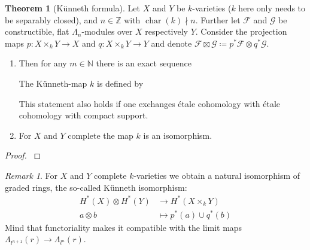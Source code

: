 \documentclass[english,headsepline=0.25pt]{scrartcl}
\theoremstyle{definition}
\newtheorem{Thm}[Def]{Theorem}
\theoremstyle{remark}
\newtheorem{Rem}[Def]{Remark}
\newcommand*{\N}{\mathds{N}}
\newcommand*{\Z}{\mathds{Z}}
\newcommand*{\Zmod}[1]{\Z/#1} %
\newcommand*{\F}{\mathcal{F}} %
\newcommand*{\G}{\mathcal{G}} %
\DeclareMathOperator{\Char}{char} %
\DeclareMathOperator{\Tor}{Tor} %
\begin{document}
\begin{Thm}[Künneth formula]\label{kuennethiso}
  Let $X$ and $Y$ be $k$-varieties
  ($k$ here only needs to be separably closed), and
  $n\in\Z$ with $\Char(k)\nmid n$.
  Further let $\F$ and $\G$ be constructible, flat $\Lambda_n$-modules
  over $X$ respectively $Y$.
  Consider the projection maps
  $p\colon X\times_k Y\to X$ and
  $q\colon X\times_k Y\to Y$ and denote
  $\F\boxtimes\G\coloneqq p^*\F\otimes q^*\G$. 
  \begin{enumerate}
  \item   Then for any $m\in\N$ there is an exact sequence
    \begin{center}
    \end{center}
    The Künneth-map $k$ is defined by
    \begin{center}
    \end{center}
    This statement also holds if one exchanges étale cohomology with
    étale cohomology with compact support.
  \item For $X$ and $Y$ complete the map $k$ is an isomorphism. 
  \end{enumerate}
  \begin{proof}\cite[][Thm.~V.8.5 and Cor.~V.8.13]{milnebook}\end{proof}
\end{Thm}

\begin{Rem}
  For $X$ and $Y$ complete $k$-varieties we obtain a natural
  isomorphism of graded rings, the so-called Künneth isomorphism:
  \begin{align*}
    H^*(X)\otimes H^*(Y) &\rightarrow H^*(X\times_k Y)\\
    a\otimes b &\mapsto p^*(a) \cup q^*(b)
  \end{align*}
  Mind that functoriality makes it compatible with the limit maps
  $\Lambda_{l^{n+1}}(r)\to\Lambda_{l^n}(r)$.
\end{Rem}
\end{document}

